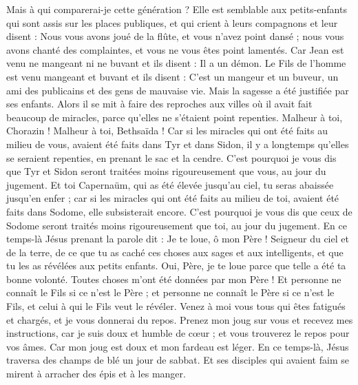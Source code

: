 \begin{multicols}{2}
{Mais à qui comparerai-je cette génération ? Elle est semblable aux petits-enfants qui sont assis sur les places publiques, et qui crient à leurs compagnons
et leur disent : Nous vous avons joué de la flûte, et vous n'avez point dansé ; nous vous avons chanté des complaintes, et vous ne vous êtes point lamentés.
Car Jean est venu ne mangeant ni ne buvant et ils disent : Il a un démon.
Le Fils de l'homme est venu mangeant et buvant et ils disent : C’est un mangeur et un buveur, un ami des publicains et des gens de mauvaise vie. Mais la sagesse a été justifiée par ses enfants.
Alors il se mit à faire des reproches aux villes où il avait fait beaucoup de miracles, parce qu’elles ne s'étaient point repenties.
Malheur à toi, Chorazin ! Malheur à toi, Bethsaïda ! Car si les miracles qui ont été faits au milieu de vous, avaient été faits dans Tyr et dans Sidon, il y a longtemps qu'elles se seraient repenties, en prenant le sac et la cendre.
C'est pourquoi je vous dis que Tyr et Sidon seront traitées moins rigoureusement que vous, au jour du jugement.
Et toi Capernaüm, qui as été élevée jusqu’au ciel, tu seras abaissée jusqu’en enfer ; car si les miracles qui ont été faits au milieu de toi, avaient été faits dans Sodome, elle subsisterait encore.
C'est pourquoi je vous dis que ceux de Sodome seront traités moins rigoureusement que toi, au jour du jugement.
En ce temps-là Jésus prenant la parole dit : Je te loue, ô mon Père ! Seigneur du ciel et de la terre, de ce que tu as caché ces choses aux sages et aux intelligents, et que tu les as révélées aux petits enfants.
Oui, Père, je te loue parce que telle a été ta bonne volonté.
Toutes choses m'ont été données par mon Père ! Et personne ne connaît le Fils si ce n’est le Père ; et personne ne connaît le Père si ce n’est le Fils, et celui à qui le Fils veut le révéler.
Venez à moi vous tous qui êtes fatigués et chargés, et je vous donnerai du repos.
Prenez mon joug sur vous et recevez mes instructions, car je suis doux et humble de cœur ; et vous trouverez le repos pour vos âmes.
Car mon joug est doux et mon fardeau est léger.
\VerseOne{}En ce temps-là, Jésus traversa des champs de blé un jour de sabbat. Et ses disciples qui avaient faim se mirent à arracher des épis et à les manger.
}
\end{multicols}
